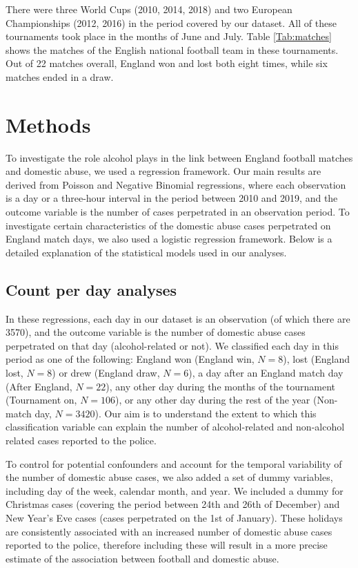 \documentclass[12pt, a4paper]{article}
\begin{document}
 There were three World Cups (2010, 2014, 2018) and two European Championships (2012, 2016) in the period covered by our dataset. All of these tournaments took place in the months of June and July. 
Table \ref{Tab:matches} shows the matches of the English national football team in these tournaments. Out of 22 matches overall, England won and lost both eight times, while six matches ended in a draw. 

\section{Methods}


To investigate the role alcohol plays in the link between England football matches and domestic abuse, we used a regression framework. Our main results are derived from Poisson and Negative Binomial regressions, where each observation is a day or a three-hour interval in the period between 2010 and 2019, and the outcome variable is the number of cases perpetrated in an observation period. To investigate certain characteristics of the domestic abuse cases perpetrated on England match days, we also used a logistic regression framework. Below is a detailed explanation of the statistical models used in our analyses.  


\subsection{Count per day analyses} 
\label{modelsexplained}


In these regressions, each day in our dataset is an observation (of which there are 3570), and the outcome variable is the number of domestic abuse cases perpetrated on that day (alcohol-related or not). We classified each day in this period as one of the following: England won (England win, $N = 8$), lost (England lost, $N = 8$) or drew (England draw, $N = 6$), a day after an England match day (After England, $N = 22$), any other day during the months of the tournament (Tournament on, $N = 106$), or any other day during the rest of the year (Non-match day, $N = 3420$). Our aim is to understand the extent to which this classification variable can explain the number of alcohol-related and non-alcohol related cases reported to the police.

To control for potential confounders and account for the temporal variability of the number of domestic abuse cases, we also added a set of dummy  variables, including day of the week, calendar month, and year. 
We included a dummy for Christmas cases (covering the period between 24th and 26th of December) and New Year's Eve cases (cases perpetrated on the 1st of January). 
These holidays are consistently associated with an increased number of domestic abuse cases reported to the police, therefore including these will result in a more precise estimate of the association between football and domestic abuse.
\end{document}
